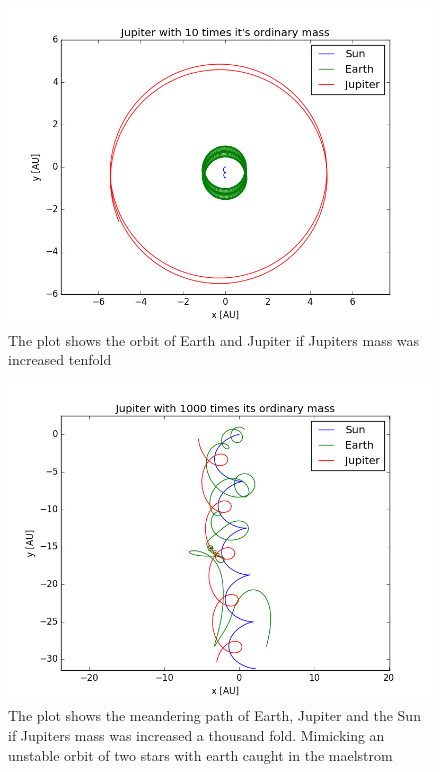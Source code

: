 \begin{figure}[h]
\includegraphics[scale=0.7]{figures/10jup}
\caption{The plot shows the orbit of Earth and Jupiter if Jupiters mass was increased tenfold }\label{fig:ten_j}
\end{figure}


\begin{figure}[h]
\includegraphics[scale=0.7]{figures/1000jup}
\caption{The plot shows the meandering path of Earth, Jupiter and the Sun if Jupiters mass was increased a thousand fold. Mimicking an unstable orbit of two stars with earth caught in the maelstrom}\label{fig:thous_j}
\end{figure}


